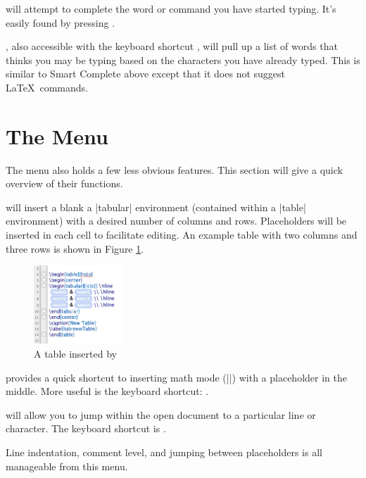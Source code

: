  will attempt to complete the word or command you have started typing. It's easily found by pressing \keys{\esckey}.

, also accessible with the keyboard shortcut , will pull up a list of words that \texnicle thinks you may be typing based on the characters you have already typed. This is similar to Smart Complete above except that it does not suggest \LaTeX\ commands.

\section[The Editor Menu]{The  Menu}
\label{reference.editortable}
The  menu also holds a few less obvious \texnicle features. This section will give a quick overview of their functions.

 will insert a blank a |tabular| environment (contained within a |table| environment) with a desired number of columns and rows. Placeholders will be inserted in each cell to facilitate editing. An example table with two columns and three rows is shown in Figure \ref{fig:texnicle-inserttable}.

\begin{figure}[htbp]
\centering
\includegraphics[width=0.3\textwidth]{TeXnicle-Images/texnicle-inserttable.png}
\caption{A table inserted by \texnicle}
\label{fig:texnicle-inserttable}
\end{figure}

 provides a quick shortcut to inserting math mode (|$ $|) with a placeholder in the middle. More useful is the keyboard shortcut: .

 will allow you to jump within the open document to a particular line or character. The keyboard shortcut is .

Line indentation, comment level, and jumping between placeholders is all manageable from this menu.

